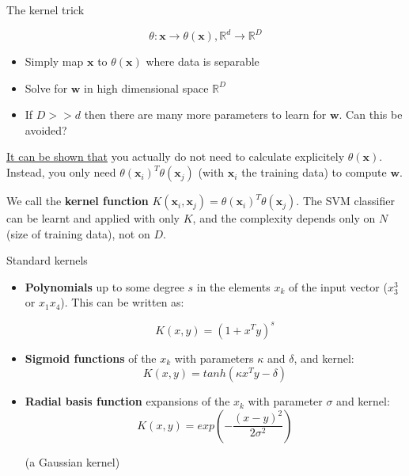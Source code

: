 \documentclass[compress]{beamer}
\begin{document}
\begin{frame}{The kernel trick}

\[
        \theta: \mathbf{x} \rightarrow  \theta(\mathbf{x}), \mathbb{R}^d \rightarrow \mathbb{R}^D
\]

\begin{itemize}
    \item Simply map $\mathbf{x}$ to $\theta(\mathbf{x})$ where data is separable
    \item Solve for $\mathbf{w}$ in high dimensional space $\mathbb{R}^D$
    \item If $D >> d$ then there are many more parameters to learn for $\mathbf{w}$. Can this be avoided?
\end{itemize}

    \href{http://www.robots.ox.ac.uk/~az/lectures/ml/lect3.pdf}{It can be shown that} you actually do not need to calculate explicitely $\theta(\mathbf{x})$. Instead, you only need $\theta(\mathbf{x}_i)^T \theta(\mathbf{x}_j)$ (with $\mathbf{x}_i$ the training data) to compute $\mathbf{w}$.

    \pause

    We call the \textbf{kernel function} $K(\mathbf{x}_i,\mathbf{x}_j) = \theta(\mathbf{x}_i)^T \theta(\mathbf{x}_j)$.
    The SVM classifier can be learnt and applied with only $K$, and the complexity depends only on $N$ (size of training data), not on $D$.


\end{frame}

\begin{frame}{Standard kernels}

\begin{itemize}

    \item \textbf{Polynomials} up to some degree $s$ in the
  elements $x_k$ of the input vector (\eg $x^3_3$ or $x_1 x_4$). This can be written as:

    \[
        K(x, y) = (1 + x^Ty)^s
    \]

\item \textbf{Sigmoid functions} of the $x_k$ with parameters $\kappa$ and $\delta$, and
  kernel:
    \[
        K(x, y) = tanh(\kappa x^T y - \delta)
    \]
\item \textbf{Radial basis function} expansions of the $x_k$ with parameter $\sigma$
  and kernel:
    \[
        K(x, y) = exp(- \frac{(x-y)^2}{2\sigma^2})
    \]

(a Gaussian kernel)

\end{itemize}

\end{frame}
\end{document}
